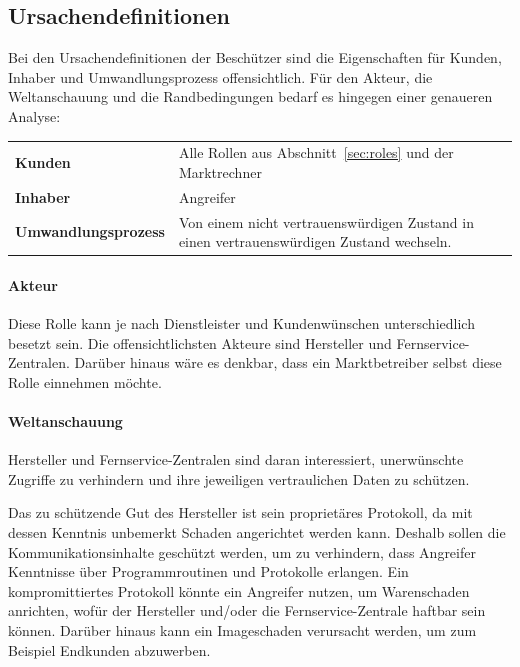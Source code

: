 \documentclass[11pt,a4paper]{report}
\begin{document}
\subsection{Ursachendefinitionen}

Bei den Ursachendefinitionen der Beschützer sind die Eigenschaften für Kunden, Inhaber und Umwandlungsprozess offensichtlich. Für den Akteur, die Weltanschauung und die Randbedingungen bedarf es hingegen einer genaueren Analyse:

\setlength{\tabcolsep}{12pt}
\renewcommand{\arraystretch}{1.5}
\begin{table}[h] %
\begin{tabularx}{\linewidth}{@{}lX@{}}
\textbf{Kunden} & Alle Rollen aus Abschnitt~\ref{sec:roles} und der Marktrechner\\
\textbf{Inhaber} & Angreifer\\
\textbf{Umwandlungsprozess} & 
Von einem nicht vertrauenswürdigen Zustand in einen vertrauenswürdigen Zustand wechseln.\\
\end{tabularx}
\end{table}

\paragraph{Akteur} Diese Rolle kann je nach Dienstleister und Kundenwünschen unterschiedlich besetzt sein. Die offensichtlichsten Akteure sind Hersteller und Fernservice-Zentralen. Darüber hinaus wäre es denkbar, dass ein Marktbetreiber selbst diese Rolle einnehmen möchte.

\paragraph{Weltanschauung} Hersteller und Fernservice-Zentralen sind daran interessiert, unerwünschte Zugriffe zu verhindern und ihre jeweiligen vertraulichen Daten zu schützen.

Das zu schützende Gut des Hersteller ist sein proprietäres Protokoll, da mit dessen Kenntnis unbemerkt Schaden angerichtet werden kann. Deshalb sollen die Kommunikationsinhalte geschützt werden, um zu verhindern, dass Angreifer Kenntnisse über Programmroutinen und Protokolle erlangen. Ein kompromittiertes Protokoll könnte ein Angreifer nutzen, um Warenschaden anrichten, wofür der Hersteller und/oder die Fernservice-Zentrale haftbar sein können. Darüber hinaus kann ein Imageschaden verursacht werden, um zum Beispiel Endkunden abzuwerben. 
\end{document}
